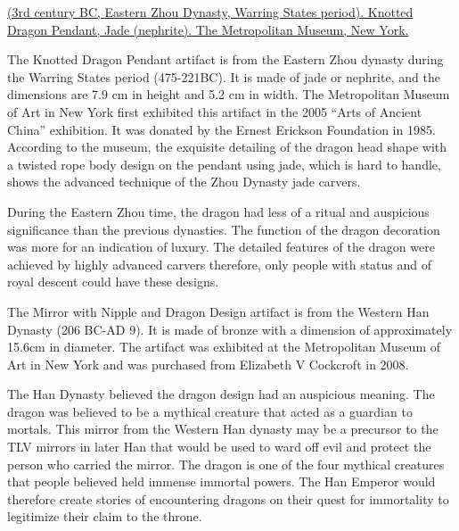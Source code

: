 \documentclass[
]{book}
\begin{document}
\href{https://www.metmuseum.org/art/collection/search/39637}{(3rd century BC, Eastern Zhou Dynasty, Warring States period). Knotted Dragon Pendant, Jade (nephrite). The Metropolitan Museum, New York.}

The Knotted Dragon Pendant artifact is from the Eastern Zhou dynasty during the Warring States period (475-221BC). It is made of jade or nephrite, and the dimensions are 7.9 cm in height and 5.2 cm in width. The Metropolitan Museum of Art in New York first exhibited this artifact in the 2005 ``Arts of Ancient China'' exhibition. It was donated by the Ernest Erickson Foundation in 1985. According to the museum, the exquisite detailing of the dragon head shape with a twisted rope body design on the pendant using jade, which is hard to handle, shows the advanced technique of the Zhou Dynasty jade carvers.

During the Eastern Zhou time, the dragon had less of a ritual and auspicious significance than the previous dynasties. The function of the dragon decoration was more for an indication of luxury. The detailed features of the dragon were achieved by highly advanced carvers therefore, only people with status and of royal descent could have these designs.

The Mirror with Nipple and Dragon Design artifact is from the Western Han Dynasty (206 BC-AD 9). It is made of bronze with a dimension of approximately 15.6cm in diameter. The artifact was exhibited at the Metropolitan Museum of Art in New York and was purchased from Elizabeth V Cockcroft in 2008.

The Han Dynasty believed the dragon design had an auspicious meaning. The dragon was believed to be a mythical creature that acted as a guardian to mortals. This mirror from the Western Han dynasty may be a precursor to the TLV mirrors in later Han that would be used to ward off evil and protect the person who carried the mirror. The dragon is one of the four mythical creatures that people believed held immense immortal powers. The Han Emperor would therefore create stories of encountering dragons on their quest for immortality to legitimize their claim to the throne.
\end{document}
